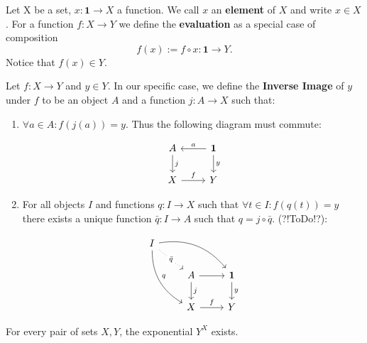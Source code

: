 \begin{definition}
Let X be a set, $x: \mathbf{1} \longrightarrow X$ a function. We call $x$ an \textbf{element} of $X$ and write $x \in X$. For a function $f:X \longrightarrow Y$ we define the \textbf{evaluation} as a special case of composition 
\begin{equation*}
f(x) := f \circ x: \mathbf{1} \longrightarrow Y.
\end{equation*}
Notice that $f(x) \in Y$.
\end{definition}

\begin{definition}[$\dagger$]
Let $f: X \longrightarrow Y$ and $y \in Y$. In our specific case, we define the \textbf{Inverse Image} of $y$ under $f$ to be an object $A$ and a function $j:A \longrightarrow X$ such that:
\begin{enumerate}
\item $\forall a \in A: f(j(a)) = y$. Thus the following diagram must commute:

\begin{equation*}
\begin{tikzcd}
A \arrow[d, "j"]
& \mathbf{1} \arrow[d, "y"] \arrow[l, "a", swap] \\
 X \arrow[r, "f"]
& Y
\end{tikzcd}
\end{equation*}

\item For all objects $I$ and functions $q: I \longrightarrow X$ such that $\forall t \in I: f(q(t)) = y$ there exists a unique function $\bar{q}: I \longrightarrow A$ such that $q = j \circ \bar{q}$. (?!ToDo!?): 

\begin{equation*}
\begin{tikzcd}
I
\arrow[drr, bend left, ""]
\arrow[ddr, bend right, "q"]
\arrow[dr, dotted, "{\bar{q}}" description] & & \\
& A \arrow[r, ""] \arrow[d, "j"]
& \mathbf{1} \arrow[d, "y"] \\
& X \arrow[r, "f"]
& Y
\end{tikzcd}
\end{equation*}


\end{enumerate}
\end{definition}

\begin{axiom}
For every pair of sets $X, Y$, the exponential $Y^X$ exists.
\end{axiom}

